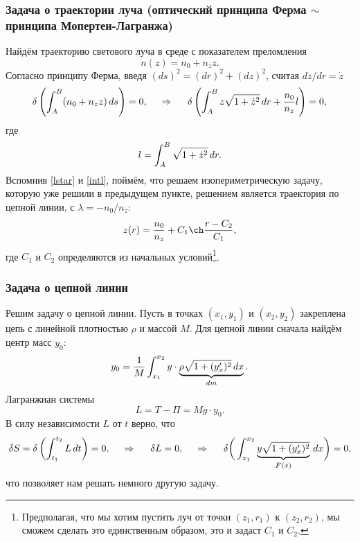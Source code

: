 \subsubsection*{Задача о траектории луча (оптический принципа Ферма $\sim$ принципа Мопертеи-Лагранжа)}

Найдём траекторию светового луча в среде с показателем преломления
\begin{equation*}
    n(z) = n_0 + n_z z.
\end{equation*}
Согласно принципу Ферма, введя $(ds)^2 = (dr)^2 + (dz)^2$, считая $dz / dr = \dot{z}$
\begin{equation*}
    \delta \left(
        \int_A^B (n_0 + n_z z) \, d s
    \right) = 0,
\hspace{0.5cm} \Rightarrow \hspace{0.5cm} 
    \delta
    \left(
        \int_A^B z \sqrt{1 + \dot{z}^2} \, d r
    + \frac{n_0}{n_z}  l 
    \right) = 0,
\end{equation*}
где
\begin{equation*}
    l = \int_A^B \sqrt{1 + \dot{z}^2} \, d r.
\end{equation*}
Вспомнив \eqref{lstar} и \eqref{intl}, 
поймём, что решаем изопериметрическую задачу, которую уже решили в предыдущем пункте, решением является траектория по цепной линии, с $\lambda = -n_0/n_z$:
\begin{equation}
    z(r) = \frac{n_0}{n_z} + C_1 \ch \frac{r-C_2}{C_1},
\end{equation}
где $C_1$ и $C_2$ определяются из начальных условий\footnote{
    Предполагая, что мы хотим пустить луч от точки $(z_1, r_1)$ к $(z_2, r_2)$, мы сможем сделать это единственным образом, это и задаст $C_1$ и $C_2$.
}.



\subsubsection*{Задача о цепной линии}

Решим задачу о цепной линии. Пусть в точках $(x_1, y_1)$ и $(x_2, y_2)$ закреплена цепь с линейной плотностью $\rho$ и массой $M$.
Для цепной линии сначала найдём центр масс $y_0$:
\begin{equation*}
    y_0 = \frac{1}{M} \int_{x_1}^{x_2}
    y \cdot 
    \underbrace{
    \rho \sqrt{1 + (y_x')^2} \, d x
    }_{
    dm
    }.
\end{equation*}
Лагранжиан системы
\begin{equation*}
    L = T - \Pi = M g \cdot y_0.
\end{equation*}
В силу независимости $L$ от $t$ верно, что
\begin{equation}
    \delta S = \delta 
    \left(\int_{t_1}^{t_2} L \, d t\right)
    = 0,
    \hspace{0.5cm} \Rightarrow \hspace{0.5cm} 
    \delta L = 0, \hspace{0.5cm} \Rightarrow \hspace{0.5cm}
    \delta
    \bigg(
    \int_{x_1}^{x_2}
    \underbrace{
    y \sqrt{1 + (y_x')^2}
    }_{
    F(x)
    } \, d x
    \bigg) = 0
    ,
\end{equation}
что позволяет нам решать немного другую задачу.

